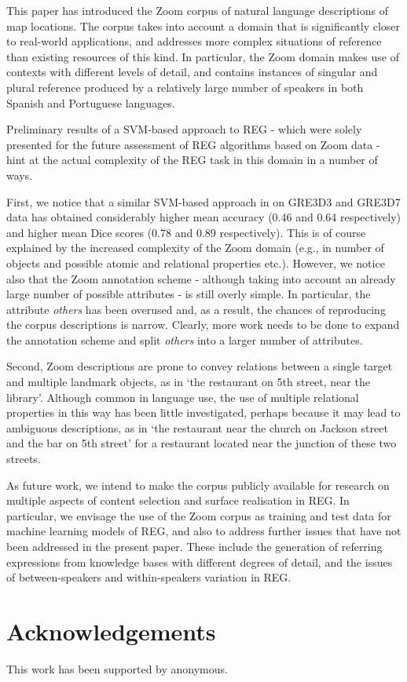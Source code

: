 \documentclass{article}
\begin{document}
This paper has introduced the Zoom corpus of natural language descriptions of map locations. The corpus takes into account a domain that is significantly closer to real-world applications, and addresses more complex situations of reference than existing resources of this kind. In particular, the Zoom domain makes use of  contexts with different levels of detail, and contains instances of singular and plural reference produced by a relatively large number of speakers in both Spanish and Portuguese languages.

Preliminary results of a SVM-based approach to REG - which were solely presented for the future assessment of REG algorithms based on Zoom data - hint at the actual complexity of the REG task in this domain in a number of ways. 

First, we notice that a similar SVM-based approach in \cite{thiago-svm} on GRE3D3 and GRE3D7 data has obtained considerably higher mean accuracy (0.46 and 0.64 respectively) and higher mean Dice scores (0.78 and 0.89 respectively). This is of course explained by the increased complexity of the Zoom domain (e.g., in number of objects and possible atomic and relational properties etc.). However, we notice also that the Zoom annotation scheme - although taking into account an already large number of possible attributes - is still overly simple. In particular, the attribute {\em others} has been overused and, as a result, the chances of reproducing the corpus descriptions is narrow. Clearly, more work needs to be done to expand the annotation scheme and split {\em others} into a larger number of attributes.

Second, Zoom descriptions are prone to convey relations between a single target and multiple landmark objects, as in `the restaurant on 5th street, near the library'. Although common in language use, the use of multiple relational properties in this way has been little investigated, perhaps because it may lead to ambiguous descriptions, as in `the restaurant near the church on Jackson street and the bar on 5th street' for a restaurant located near the junction of these two streets.

As future work, we intend to make the corpus publicly available for research on multiple aspects of content selection and surface realisation in REG. In particular, we envisage the use of the Zoom corpus as training and test data for machine learning models of REG, and also to address further issues that have not been addressed in the present paper. These include  the generation of referring expressions from knowledge bases with different degrees of detail, and the issues of between-speakers and within-speakers variation in REG.


\section*{Acknowledgements}
This work has been supported by anonymous. 

\clearpage

\end{document}
